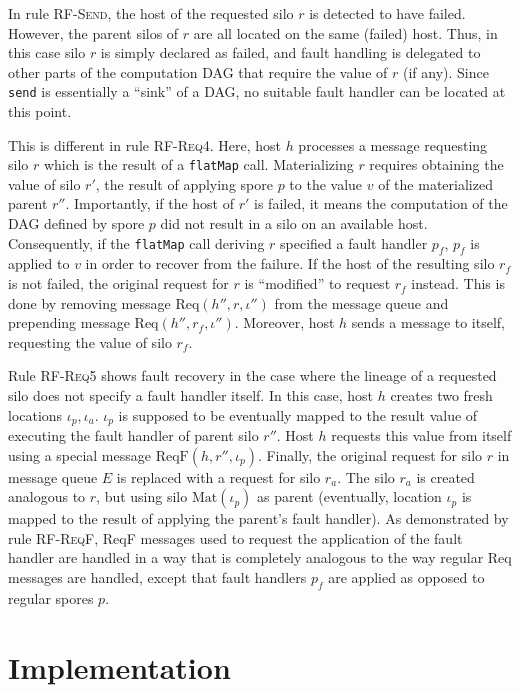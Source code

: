 \documentclass[preprint]{sigplanconf}
\theoremstyle{definition}
\theoremstyle{definition}
\begin{document}
In rule \textsc{RF-Send}, the host of the requested silo $r$ is detected to have
failed. However, the parent silos of $r$ are all located on the same (failed)
host. Thus, in this case silo $r$ is simply declared as failed, and fault
handling is delegated to other parts of the computation DAG that require the
value of $r$ (if any). Since \texttt{send} is essentially a ``sink'' of a DAG,
no suitable fault handler can be located at this point.

This is different in rule \textsc{RF-Req4}. Here, host $h$ processes a message
requesting silo $r$ which is the result of a \texttt{flatMap} call.
Materializing $r$ requires obtaining the value of silo $r'$, the result of
applying spore $p$ to the value $v$ of the materialized parent $r''$.
Importantly, if the host of $r'$ is failed, it means the computation of the
DAG defined by spore $p$ did not result in a silo on an available host.
Consequently, if the \texttt{flatMap} call deriving $r$ specified a fault
handler $p_f$, $p_f$ is applied to $v$ in order to recover from the failure.
If the host of the resulting silo $r_f$ is not failed, the original request
for $r$ is ``modified'' to request $r_f$ instead. This is done by removing
message $\text{Req}(h'', r, \iota'')$ from the message queue and prepending
message $\text{Req}(h'', r_f, \iota'')$. Moreover, host $h$ sends a message to
itself, requesting the value of silo $r_f$.

Rule \textsc{RF-Req5} shows fault recovery in the case where the lineage of a
requested silo does not specify a fault handler itself. In this case, host $h$
creates two fresh locations $\iota_p, \iota_a$. $\iota_p$ is supposed to be
eventually mapped to the result value of executing the fault handler of parent
silo $r''$. Host $h$ requests this value from itself using a special message
$\text{ReqF}(h, r'', \iota_p)$. Finally, the original request for silo $r$ in
message queue $E$ is replaced with a request for silo $r_a$. The silo $r_a$ is
created analogous to $r$, but using silo $\text{Mat}(\iota_p)$ as parent
(eventually, location $\iota_p$ is mapped to the result of applying the
parent's fault handler). As demonstrated by rule \textsc{RF-ReqF}, ReqF
messages used to request the application of the fault handler are handled in a
way that is completely analogous to the way regular Req messages are handled,
except that fault handlers $p_f$ are applied as opposed to regular spores $p$.


\section{Implementation}
\label{sec:implementation}
\end{document}
